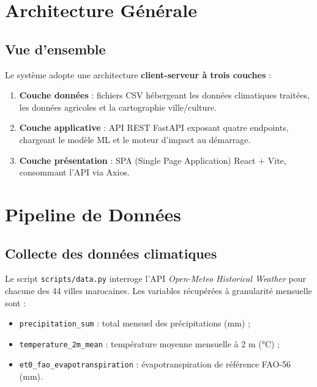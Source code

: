 \documentclass[12pt,a4paper]{report}
\begin{document}
\chapter{Architecture Générale}

\section{Vue d'ensemble}

Le système adopte une architecture \textbf{client-serveur à trois couches} :

\begin{enumerate}
    \item \textbf{Couche données} : fichiers CSV hébergeant les données climatiques traitées, les données agricoles et la cartographie ville/culture.
    \item \textbf{Couche applicative} : API REST FastAPI exposant quatre endpoints, chargeant le modèle ML et le moteur d'impact au démarrage.
    \item \textbf{Couche présentation} : SPA (Single Page Application) React + Vite, consommant l'API via Axios.
\end{enumerate}



\chapter{Pipeline de Données}

\section{Collecte des données climatiques}

Le script \texttt{scripts/data.py} interroge l'API \textit{Open-Meteo Historical Weather} pour chacune des 44 villes marocaines. Les variables récupérées à granularité mensuelle sont :

\begin{itemize}
    \item \texttt{precipitation\_sum} : total mensuel des précipitations (mm) ;
    \item \texttt{temperature\_2m\_mean} : température moyenne mensuelle à 2 m (°C) ;
    \item \texttt{et0\_fao\_evapotranspiration} : évapotranspiration de référence FAO-56 (mm).
\end{itemize}
\end{document}
